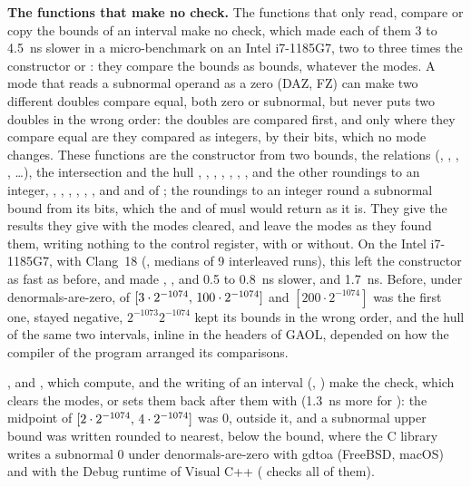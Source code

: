 \documentclass[12pt,a4paper,twoside,openright]{book}
\begin{document}
\medskip
\noindent
\textbf{The functions that make no check.} The functions that only read,
compare or copy the bounds of an interval make no check, which made each of
them 3 to 4.5~ns slower in a micro-benchmark on an Intel i7-1185G7, two to
three times the constructor or : they compare the
bounds as bounds, whatever the modes.\newinvfive{} A mode that reads a
subnormal operand as a zero (DAZ, FZ) can make two different doubles compare
equal, both zero or subnormal, but never puts two doubles in the wrong order:
the doubles are compared first, and only where they compare equal are they
compared as integers, by their bits, which no mode changes. These functions
are the constructor from two bounds, the relations (,
, , ,
\dots), the intersection \code{\&} and the hull
\code{|}, , , , ,
, ,  and the other roundings to an
integer, , , ,
, , , and
 and  of ; the roundings to an
integer round a subnormal bound from its bits, which the  and
 of musl would return as it is. They give the results they give
with the modes cleared, and leave the modes as they found them, writing
nothing to the control register, with  or
without. On the Intel i7-1185G7, with Clang~18 (,
medians of 9 interleaved runs), this left the constructor as fast as before,
and made , ,  and
 0.5 to 0.8~ns slower, and  1.7~ns. Before, under
denormals-are-zero,  of
$[3\cdot2^{-1074},\,100\cdot2^{-1074}]$ and $[200\cdot2^{-1074}]$ was the
first one,  stayed negative,
$2^{-1073}$\code{, }$2^{-1074}$\code{)} kept its bounds in
the wrong order, and the hull \code{|} of the same two intervals, inline in
the headers of GAOL, depended on how the compiler of the program arranged its
comparisons.

\medskip
{},  and , which compute, and the
writing of an interval (, ) make
the check, which clears the modes, or sets them back after them with
 (1.3~ns more for ): the
midpoint of $[2\cdot2^{-1074},\,4\cdot2^{-1074}]$ was 0, outside it, and
a subnormal upper bound was written rounded to nearest, below the bound,
where the C library writes a subnormal 0 under denormals-are-zero with gdtoa
(FreeBSD, macOS) and with the Debug runtime of Visual C++
( checks all of them).
\end{document}
